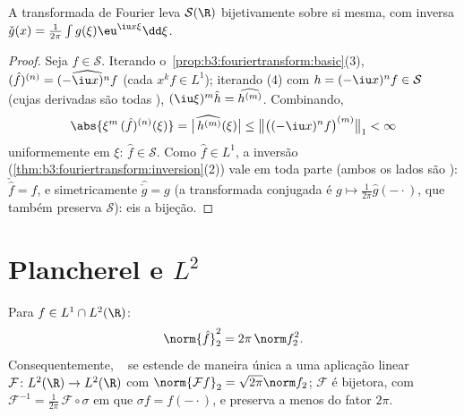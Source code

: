 \begin{theorem}\label{thm:b3:fouriertransform:schwartz}
A transformada de Fourier leva $\mathcal S(\R)$ bijetivamente sobre si mesma, com
inversa $\check g(x) = \frac1{2\pi}\int
g(\xi)\eu^{\iu x\xi}\dd\xi$.
\end{theorem}

\begin{proof}
Seja $f \in \mathcal S$. Iterando o~\cref{prop:b3:fouriertransform:basic}(3), $(\hat f)^{(n)} =
\widehat{(-\iu x)^nf}$ (cada $x^kf \in L^1$); iterando
(4) com $h = (-\iu x)^nf \in \mathcal S$ (cujas derivadas são todas ), $(\iu\xi)^m\hat h =
\widehat{h^{(m)}}$. Combinando,
\[
\abs{\xi^m\,(\hat f)^{(n)}(\xi)}
= \bigl|\widehat{\,h^{(m)}}(\xi)\bigr|
\leq \bigl\|\bigl((-\iu x)^nf\bigr)^{(m)}\bigr\|_1 < \infty
\]
uniformemente em $\xi$: $\hat f \in \mathcal S$. Como $\hat f \in L^1$, a inversão
(\cref{thm:b3:fouriertransform:inversion}(2)) vale em toda parte (ambos os lados são ):
$\check{\hat f} = f$, e simetricamente $\widehat{\check g} = g$ (a transformada conjugada é $g \mapsto \frac1{2\pi}\hat g(-\cdot)$, que
também preserva $\mathcal S$): eis a bijeção.
\end{proof}

\section{Plancherel e \texorpdfstring{$L^2$}{L2}}

\begin{theorem}[Plancherel]\label{thm:b3:fouriertransform:plancherel}
Para $f \in L^1 \cap L^2(\R)$:
\[
\norm{\hat f}_2^2 = 2\pi\,\norm f_2^2 .
\]
Consequentemente, $\widehat{\phantom f}$ se estende de maneira única a uma aplicação
linear  $\mathcal F \colon L^2(\R) \to L^2(\R)$ com $\norm{\mathcal Ff}_2 = \sqrt{2\pi}\norm f_2$; $\mathcal
F$ é bijetora, com $\mathcal F^{-1} =
\frac1{2\pi}\,\mathcal F\circ\sigma$ em que
$\sigma f =
f(-\cdot)$, e preserva  a menos do fator $2\pi$.
\end{theorem}

